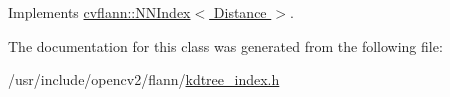 Implements \hyperlink{classcvflann_1_1NNIndex_acdcc255d1b67d5636a0f76b68809e6be}{cvflann\-::\-N\-N\-Index$<$ Distance $>$}.



The documentation for this class was generated from the following file\-:\begin{DoxyCompactItemize}
\item 
/usr/include/opencv2/flann/\hyperlink{kdtree__index_8h}{kdtree\-\_\-index.\-h}\end{DoxyCompactItemize}
